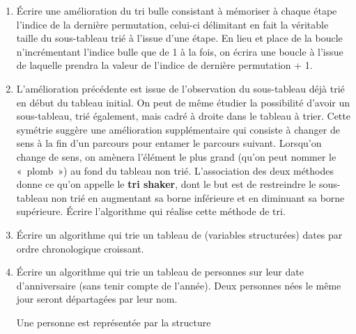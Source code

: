		\liststyleExercice
		\setcounter{saveenum}{\value{enumi}}
		\begin{enumerate}
		\setcounter{enumi}{\value{saveenum}}
			\item 
				Écrire une amélioration du tri bulle consistant à mémoriser à chaque
				étape l’indice de la dernière permutation, celui-ci délimitant en fait
				la véritable taille du sous-tableau trié à l’issue d’une étape. En lieu
				et place de la boucle  n’incrémentant l’indice
				bulle que de 1 à la fois, on écrira une boucle  à l’issue de laquelle  prendra la
				valeur de l’indice de dernière permutation + 1.
			\item 
				L’amélioration précédente est issue de l’observation du sous-tableau
				déjà trié en début du tableau initial. On peut de même étudier la
				possibilité d’avoir un sous-tableau, trié également, mais cadré à
				droite dans le tableau à trier. Cette symétrie suggère une amélioration
				supplémentaire qui consiste à changer de sens à la fin d’un parcours
				pour entamer le parcours suivant. Lorsqu’on change de sens, on amènera
				l’élément le plus grand (qu’on peut nommer le «~plomb~») au fond du
				tableau non trié. L’association des deux méthodes donne ce qu’on
				appelle le \textbf{tri shaker}, dont le but est de restreindre le
				sous-tableau non trié en augmentant sa borne inférieure et en diminuant
				sa borne supérieure. Écrire l’algorithme qui réalise cette méthode de
				tri.
			\item 
				Écrire un algorithme qui trie un tableau de (variables structurées)
				dates par ordre chronologique croissant.
			\item 
				Écrire un algorithme qui trie un tableau de personnes sur leur date
				d'anniversaire (sans tenir compte de
				l'année). Deux personnes nées le même jour seront
				départagées par leur nom.

				Une personne est représentée par la structure 
				
				\bigskip
				
				
			\end{enumerate}
			
			\bigskip

